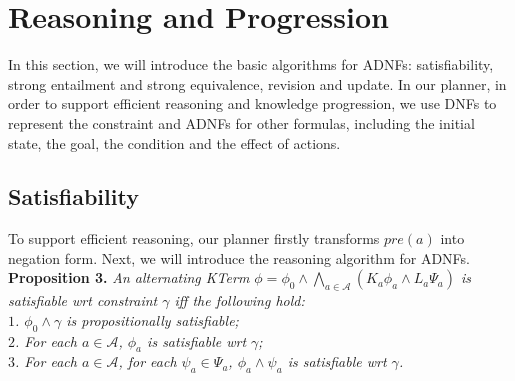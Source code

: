 \documentclass{llncs}
\begin{document}
\section{Reasoning and Progression}
In this section, we will introduce the basic algorithms for ADNFs: satisfiability, strong entailment and strong equivalence, revision and update. In our planner, in order to support efficient reasoning and knowledge progression, we use DNFs to represent the constraint and ADNFs for other formulas, including the initial state, the goal, the condition and the effect of actions.
\subsection{Satisfiability}
To support efficient reasoning, our planner firstly transforms $pre(a)$ into negation form. Next, we will introduce the reasoning algorithm for ADNFs.\vspace{0.05in}\\
\textbf{Proposition 3.} \textit{An alternating KTerm $\phi=\phi_0\land\bigwedge_{a\in\mathcal{A}}(K_a\phi_a\land L_a\Psi_a)$ is satisfiable wrt constraint $\gamma$ iff the following hold:\\
\hspace*{0.1in} $1$. $\phi_0\land\gamma$ is propositionally satisfiable;\\
\hspace*{0.1in} $2$. For each $a \in \mathcal{A}$, $\phi_a$ is satisfiable wrt $\gamma$;\\
\hspace*{0.1in} $3$. For each $a \in \mathcal{A}$, for each $\psi_a\in\Psi_a$, $\phi_a\land\psi_a$ is satisfiable wrt $\gamma$.}\vspace{0.05in}\\
\end{document}
